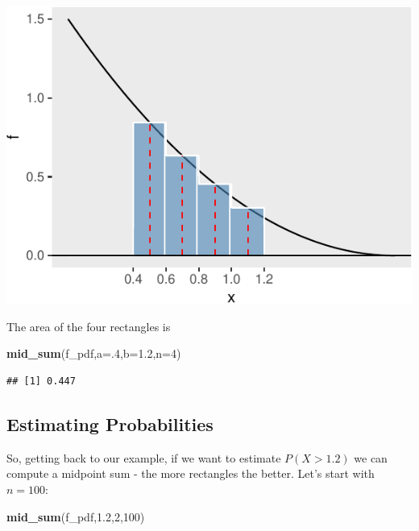 \documentclass[
]{book}
\newenvironment{Shaded}{\begin{snugshade}}{\end{snugshade}}
\newcommand{\AttributeTok}[1]{\textcolor[rgb]{0.13,0.29,0.53}{#1}}
\newcommand{\DecValTok}[1]{\textcolor[rgb]{0.00,0.00,0.81}{#1}}
\newcommand{\FloatTok}[1]{\textcolor[rgb]{0.00,0.00,0.81}{#1}}
\newcommand{\FunctionTok}[1]{\textcolor[rgb]{0.13,0.29,0.53}{\textbf{#1}}}
\newcommand{\NormalTok}[1]{#1}
\theoremstyle{definition}
\theoremstyle{definition}
\theoremstyle{definition}
\theoremstyle{definition}
\theoremstyle{remark}
\begin{document}
\includegraphics{math340-notes_files/figure-latex/midpoint-sum-1.pdf}

The area of the four rectangles is

\begin{Shaded}
\begin{Highlighting}[]
\FunctionTok{mid\_sum}\NormalTok{(f\_pdf,}\AttributeTok{a=}\NormalTok{.}\DecValTok{4}\NormalTok{,}\AttributeTok{b=}\FloatTok{1.2}\NormalTok{,}\AttributeTok{n=}\DecValTok{4}\NormalTok{)}
\end{Highlighting}
\end{Shaded}

\begin{verbatim}
## [1] 0.447
\end{verbatim}

\subsection*{Estimating Probabilities}\label{estimating-probabilities}

So, getting back to our example, if we want to estimate \(P(X > 1.2)\) we can compute a midpoint sum - the more rectangles the better. Let's start with \(n = 100\):

\begin{Shaded}
\begin{Highlighting}[]
\FunctionTok{mid\_sum}\NormalTok{(f\_pdf,}\FloatTok{1.2}\NormalTok{,}\DecValTok{2}\NormalTok{,}\DecValTok{100}\NormalTok{)}
\end{Highlighting}
\end{Shaded}
\end{document}
